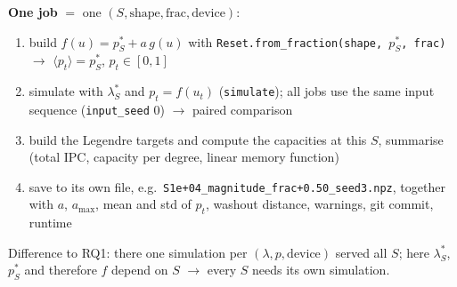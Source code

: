 \textbf{One job} $=$ one $(S, \text{shape}, \text{frac}, \text{device})$:
\begin{enumerate}
    \item build $f(u) = p^*_S + a\, g(u)$ with \texttt{Reset.from\_fraction(shape, $p^*_S$, frac)}
    $\to$ $\langle p_t \rangle = p^*_S$, $p_t \in [0, 1]$
    \item simulate with $\lambda^*_S$ and $p_t = f(u_t)$ (\texttt{simulate}); all jobs use the same input sequence
    (\texttt{input\_seed} 0) $\to$ paired comparison
    \item build the Legendre targets and compute the capacities at this $S$, summarise (total IPC, capacity per
    degree, linear memory function)
    \item save to its own file, e.g.\ \texttt{S1e+04\_magnitude\_frac+0.50\_seed3.npz}, together with $a$,
    $a_{\max}$, mean and std of $p_t$, washout distance, warnings, git commit, runtime
\end{enumerate}
Difference to RQ1: there one simulation per $(\lambda, p, \text{device})$ served all $S$; here $\lambda^*_S$,
$p^*_S$ and therefore $f$ depend on $S$ $\to$ every $S$ needs its own simulation.


